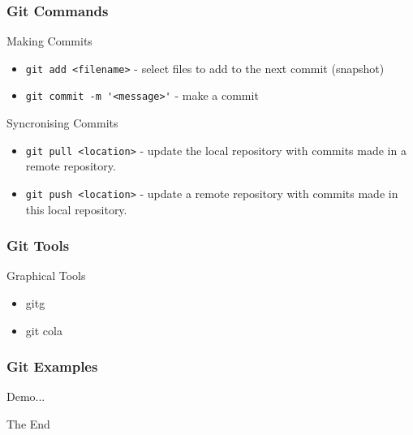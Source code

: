 \documentclass{beamer}
\begin{document}
\begin{frame}[fragile]
\frametitle{Git Commands}

\begin{block}{Making Commits}
\begin{itemize}
\item \verb|git add <filename>| - select files to add to the next commit (snapshot)
\item \verb|git commit -m '<message>'| - make a commit
\end{itemize}
\end{block}


\begin{block}{Syncronising Commits}
\begin{itemize}
\item \verb|git pull <location>| - update the local repository with commits made in a remote repository.
\item \verb|git push <location>| - update a remote repository with commits made in this local repository.
\end{itemize}
\end{block}
\end{frame}


\begin{frame}[fragile]
\frametitle{Git Tools}

\begin{block}{Graphical Tools}
\begin{itemize}
\item gitg
\item git cola
\end{itemize}
\end{block}
\end{frame}






\begin{frame}
\frametitle{Git Examples}
\begin{block}{Demo...}
\end{block}
\end{frame}





 
\begin{frame}
\centerline{The End}
\end{frame}
\end{document}
